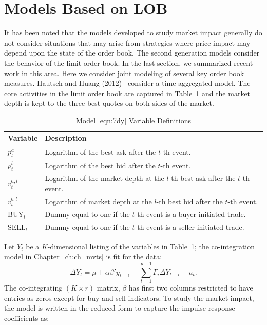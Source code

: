 \section{Models Based on LOB}

It has been noted that the models developed to study market impact generally do not consider situations that may arise from strategies where price impact may depend upon the state of the order book. The second generation models consider the behavior of the limit order book. In the last section, we summarized recent work in this area. Here we consider joint modeling of several key order book measures. Hautsch and Huang (2012)~\cite{hauthuang} consider a time-aggregated model. The core activities in the limit order book are captured in Table~\ref{tab:vardef} and the market depth is kept to the three best quotes on both sides of the market.
	\begin{table}[!ht]
	\centering
	\caption{Model \eqref{eqn:7dy} Variable Definitions \label{tab:vardef}}
	\begin{tabular}{ll}
	Variable & Description \\ \hline
	$p_t^a$ & Logarithm of the best ask after the $t$-th event. \\
	$p_t^b$ & Logarithm of the best bid after the $t$-th event. \\
	$v_t^{a,l}$ & Logarithm of the market depth at the $l$-th best ask after the $t$-th event. \\
	$v_t^{b,l}$ & Logarithm of market depth at the $l$-th best bid after the $t$-th event. \\
	$\text{BUY}_t$ & Dummy equal to one if the $t$-th event is a buyer-initiated trade. \\
	$\text{SELL}_t$ & Dummy equal to one if the $t$-th event is a seller-initiated trade. 
	\end{tabular} 
	\end{table}
Let $Y_t$ be a $K$-dimensional listing of the variables in Table~\ref{tab:vardef}; the co-integration model in Chapter~\ref{ch:ch_mvts} is fit for the data:
	\begin{equation} \label{eqn:7dy}
	\Delta Y_t = \mu + \alpha \beta' y_{t-1} + \sum_{t=1}^{p-1} \Gamma_i \Delta Y_{t-i} + u_t.
	\end{equation}
The co-integrating $(K \times r)$ matrix, $\beta$ has first two columns restricted to have entries as zeros except for buy and sell indicators. To study the market impact, the model is written in the reduced-form to capture the impulse-response coefficients as:
